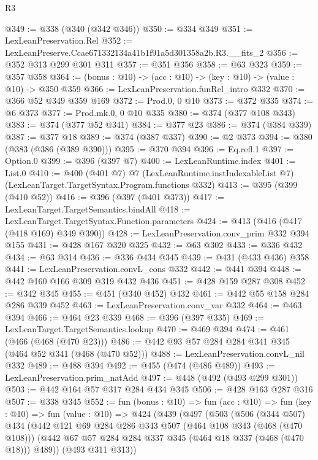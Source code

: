 \begin{lexlean}{R3}
\begin{coremodule}
@349 := @338 (@340 (@342 @346))
@350 := @334 @349
@351 := LexLeanPreservation.Rel
@352 := LexLeanPreserve.Ccae671332134a41b1f91a5d301358a2b.R3.__fits_2
@356 := @352 @313 @299 @301 @311
@357 := @351 @356
@358 := @63 @323
@359 := @357 @358
@364 := (bonus : @10) -> (acc : @10) -> (key : @10) -> (value : @10) -> @350 @359
@366 := LexLeanPreservation.funRel_intro @332
@370 := @366 @52 @349 @359 @169
@372 := Prod.{0, 0} @10
@373 := @372 @335
@374 := @6 @373
@377 := Prod.mk.{0, 0} @10 @335
@380 := @374 (@377 @108 @343)
@383 := @374 (@377 @52 @341)
@384 := @377 @23
@386 := @374 (@384 @339)
@387 := @377 @18
@389 := @374 (@387 @337)
@390 := @2 @373
@394 := @380 (@383 (@386 (@389 @390)))
@395 := @370 @394
@396 := Eq.refl.{1}
@397 := Option.{0}
@399 := @396 (@397 @7)
@400 := LexLeanRuntime.index
@401 := List.{0}
@410 := @400
    (@401 @7)
    @7
    (LexLeanRuntime.instIndexableList @7)
    (LexLeanTarget.TargetSyntax.Program.functions @332)
@413 := @395 (@399 (@410 @52))
@416 := @396 (@397 (@401 @373))
@417 := LexLeanTarget.TargetSemantics.bindAll
@418 := LexLeanTarget.TargetSyntax.Function.parameters
@424 := @413 (@416 (@417 (@418 @169) @349 @390))
@428 := LexLeanPreservation.conv_prim @332 @394 @155
@431 := @428 @167 @320 @325
@432 := @63 @302
@433 := @336 @432
@434 := @63 @314
@436 := @336 @434 @345
@439 := @431 (@433 @436) @358
@441 := LexLeanPreservation.convL_cons @332
@442 := @441 @394
@448 := @442 @160 @166 @309 @319 @432 @436
@451 := @428 @159 @287 @308
@452 := @342 @345
@455 := @451 (@340 @452) @432
@461 := @442 @55 @158 @284 @286 @339 @452
@463 := LexLeanPreservation.conv_var @332
@464 := @463 @394
@466 := @464 @23 @339
@468 := @396 (@397 @335)
@469 := LexLeanTarget.TargetSemantics.lookup
@470 := @469 @394
@474 := @461 (@466 (@468 (@470 @23)))
@486 := @442 @93 @57 @284 @284 @341 @345 (@464 @52 @341 (@468 (@470 @52)))
@488 := LexLeanPreservation.convL_nil @332
@489 := @488 @394
@492 := @455 (@474 (@486 @489))
@493 := LexLeanPreservation.prim_natAdd
@497 := @448 (@492 (@493 @299 @301))
@503 := @442 @164 @57 @317 @284 @434 @345
@506 := @428 @163 @287 @316
@507 := @338 @345
@552 := fun (bonus : @10) =>
  fun (acc : @10) =>
  fun (key : @10) =>
  fun (value : @10) =>
  @424
    (@439
      (@497
        (@503
          (@506
            (@344 @507)
            @434
            (@442
              @121
              @69
              @284
              @286
              @343
              @507
              (@464 @108 @343 (@468 (@470 @108)))
              (@442 @67 @57 @284 @284 @337 @345 (@464 @18 @337 (@468 (@470 @18))) @489))
            (@493 @311 @313))

\end{coremodule}
\end{lexlean}
